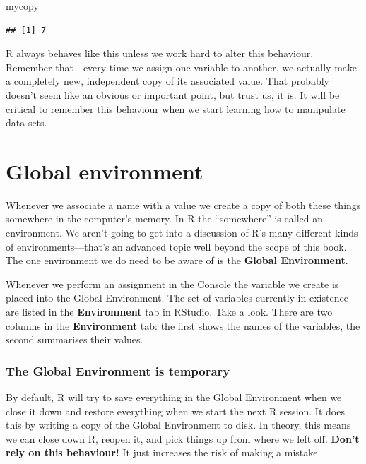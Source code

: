 \documentclass[
]{book}
\newenvironment{Shaded}{\begin{snugshade}}{\end{snugshade}}
\newcommand{\NormalTok}[1]{#1}
\newenvironment{greybox}{
  \definecolor{shadecolor}{rgb}{0.95,0.95,0.95}  %
  \color{black}
  \begin{shaded}}
 {\end{shaded}}
\newenvironment{infobox}[1]
  {
  \begin{itemize}
  \renewcommand{\labelitemi}{
    \raisebox{-.7\height}[0pt][0pt]{
      {\setkeys{Gin}{width=3em,keepaspectratio}
        \texttt{[image: images/\#1]}}
    }
  }
  \setlength{\fboxsep}{1em}
  \begin{greybox}
  \item
  }
  {
  \end{greybox}
  \end{itemize}
  }
\begin{document}
\begin{Shaded}
\begin{Highlighting}[]
\NormalTok{mycopy}
\end{Highlighting}
\end{Shaded}

\begin{verbatim}
## [1] 7
\end{verbatim}

R always behaves like this unless we work hard to alter this behaviour. Remember that---every time we assign one variable to another, we actually make a completely new, independent copy of its associated value. That probably doesn't seem like an obvious or important point, but trust us, it is. It will be critical to remember this behaviour when we start learning how to manipulate data sets.

\hypertarget{global-environment}{%
\section{Global environment}\label{global-environment}}

Whenever we associate a name with a value we create a copy of both these things somewhere in the computer's memory. In R the ``somewhere'' is called an environment. We aren't going to get into a discussion of R's many different kinds of environments---that's an advanced topic well beyond the scope of this book. The one environment we do need to be aware of is the \textbf{Global Environment}.

Whenever we perform an assignment in the Console the variable we create is placed into the Global Environment. The set of variables currently in existence are listed in the \textbf{Environment} tab in RStudio. Take a look. There are two columns in the \textbf{Environment} tab: the first shows the names of the variables, the second summarises their values.

\begin{infobox}{warning}

\hypertarget{the-global-environment-is-temporary}{%
\subsubsection*{The Global Environment is temporary}\label{the-global-environment-is-temporary}}

By default, R will try to save everything in the Global Environment when we close it down and restore everything when we start the next R session. It does this by writing a copy of the Global Environment to disk. In theory, this means we can close down R, reopen it, and pick things up from where we left off. \textbf{Don't rely on this behaviour!} It just increases the risk of making a mistake.

\end{infobox}
\end{document}
